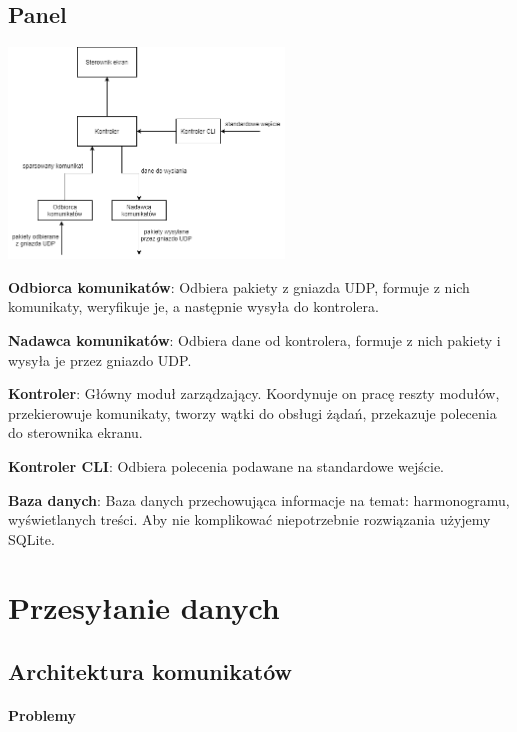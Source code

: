 \documentclass[12pt, a4paper]{article}
\begin{document}
\hypertarget{panel}{%
\subsection{Panel}\label{panel}}

\begin{center}
\includegraphics[width=0.55\textwidth]{W1wvgPi}
\end{center}

\textbf{Odbiorca komunikatów}: Odbiera pakiety z gniazda UDP, formuje z
nich komunikaty, weryfikuje je, a następnie wysyła do kontrolera.

\textbf{Nadawca komunikatów}: Odbiera dane od kontrolera, formuje z nich
pakiety i wysyła je przez gniazdo UDP.

\textbf{Kontroler}: Główny moduł zarządzający. Koordynuje on pracę reszty
modułów, przekierowuje komunikaty, tworzy wątki do obsługi żądań,
przekazuje polecenia do sterownika ekranu.

\textbf{Kontroler CLI}: Odbiera polecenia podawane na standardowe
wejście.

\textbf{Baza danych}: Baza danych przechowująca informacje na temat:
harmonogramu, wyświetlanych treści. Aby nie komplikować niepotrzebnie
rozwiązania użyjemy SQLite.

\hypertarget{przesyux142anie-danych}{%
\section{Przesyłanie danych}\label{przesyux142anie-danych}}

\hypertarget{architektura-komunikatuxf3w}{%
\subsection{Architektura komunikatów}\label{architektura-komunikatuxf3w}}

\hypertarget{problemy}{%
\paragraph{Problemy}\label{problemy}}
\end{document}
